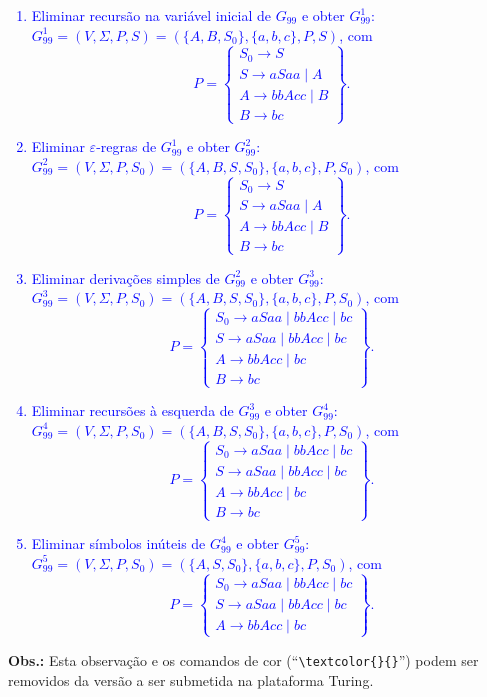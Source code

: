 \documentclass[12pt]{article}
\def\myling{{99}} %
\begin{document}
\textcolor{blue}{
\begin{enumerate}
  \item Eliminar recursão na variável inicial de $G_{\myling}$ e obter $G_{\myling}^1$:\\
  $G_{\myling}^1=(V,\Sigma,P,S)=(\{A,B,S_0\},\{a,b,c\},P,S)$, com
    $$
     P =
     \left\{\begin{array}{l}
      S_0\to S\\
      S\to aSaa\mid A\\
      A\to bbAcc\mid B\\
      B\to bc
     \end{array}\right\}.
    $$
  \item Eliminar $\varepsilon$-regras de $G_{\myling}^1$ e obter $G_{\myling}^2$:\\
  $G_{\myling}^2=(V,\Sigma,P,S_0)=(\{A,B,S,S_0\},\{a,b,c\},P,S_0)$, com
    $$
     P =
     \left\{\begin{array}{l}
      S_0\to S\\
      S\to aSaa\mid A\\
      A\to bbAcc\mid B\\
      B\to bc
     \end{array}\right\}.
    $$
  \item Eliminar derivações simples de $G_{\myling}^2$ e obter $G_{\myling}^3$:\\
  $G_{\myling}^3=(V,\Sigma,P,S_0)=(\{A,B,S,S_0\},\{a,b,c\},P,S_0)$, com
    $$
     P =
     \left\{\begin{array}{l}
      S_0\to aSaa\mid bbAcc\mid bc\\
      S\to aSaa\mid bbAcc\mid bc\\
      A\to bbAcc\mid bc\\
      B\to bc
     \end{array}\right\}.
    $$
  \item Eliminar recursões à esquerda de $G_{\myling}^3$ e obter $G_{\myling}^4$:\\
  $G_{\myling}^4=(V,\Sigma,P,S_0)=(\{A,B,S,S_0\},\{a,b,c\},P,S_0)$, com
    $$
     P =
     \left\{\begin{array}{l}
      S_0\to aSaa\mid bbAcc\mid bc\\
      S\to aSaa\mid bbAcc\mid bc\\
      A\to bbAcc\mid bc\\
      B\to bc
     \end{array}\right\}.
    $$
  \item Eliminar símbolos inúteis de $G_{\myling}^4$ e obter $G_{\myling}^5$:\\
  $G_{\myling}^5=(V,\Sigma,P,S_0)=(\{A,S,S_0\},\{a,b,c\},P,S_0)$, com
    $$
     P =
     \left\{\begin{array}{l}
      S_0\to aSaa\mid bbAcc\mid bc\\
      S\to aSaa\mid bbAcc\mid bc\\
      A\to bbAcc\mid bc
     \end{array}\right\}.
    $$
\end{enumerate}
}
%
\noindent\textbf{Obs.:} Esta observação e os comandos de cor (``\verb|\textcolor{}{}|'') podem ser removidos da versão a ser submetida na plataforma Turing.
\end{document}
